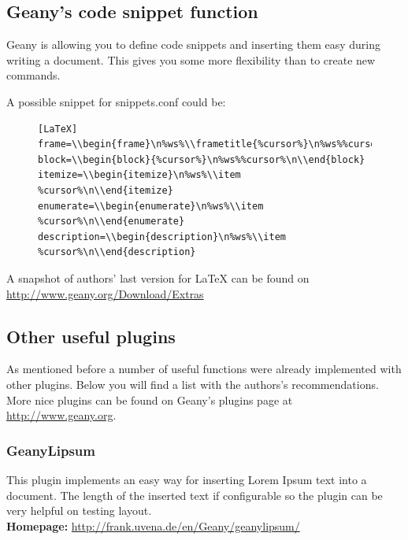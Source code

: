 \documentclass[%
paper=a4,%
fontsize=11pt,%
twoside=false,%
DIV18,
headsepline,
plainheadsepline,
footsepline,
plainfootsepline,
bibliography=totoc,%
listof=totoc,%
BCOR10mm,%
parskip=half,%
openany,%
]{scrartcl}
\begin{document}
\subsection{Geany's code snippet function}
Geany is allowing you to define code snippets and inserting them easy
during writing a document. This gives you some more flexibility than to
create new commands.

A possible snippet for snippets.conf could be:

\begin{figure}[h!]
\begin{lstlisting}
[LaTeX]
frame=\\begin{frame}\n%ws%\\frametitle{%cursor%}\n%ws%%cursor%\n\\end{frame}
block=\\begin{block}{%cursor%}\n%ws%%cursor%\n\\end{block}
itemize=\\begin{itemize}\n%ws%\\item %cursor%\n\\end{itemize}
enumerate=\\begin{enumerate}\n%ws%\\item %cursor%\n\\end{enumerate}
description=\\begin{description}\n%ws%\\item %cursor%\n\\end{description}
\end{lstlisting}
\end{figure}

A snapshot of authors' last version for LaTeX can be found on
\url{http://www.geany.org/Download/Extras}

\subsection{Other useful plugins}
As mentioned before a number of useful functions were already
implemented with other plugins. Below you will find a list with the
authors's recommendations. More nice plugins can be found on Geany's
plugins page at \url{http://www.geany.org}.

\subsubsection{GeanyLipsum}
This plugin implements an easy way for inserting Lorem Ipsum text into
a document. The length of the inserted text if configurable so the
plugin can be very helpful on testing layout.\\
\textbf{Homepage:} \url{http://frank.uvena.de/en/Geany/geanylipsum/}
\end{document}
